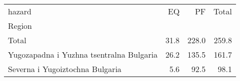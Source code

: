 \begin{tabular}{lrrr}
\toprule
hazard &    EQ &     PF &  Total \\
Region                                   &       &        &        \\
\midrule
Total                                    &  31.8 &  228.0 &  259.8 \\
Yugozapadna i Yuzhna tsentralna Bulgaria &  26.2 &  135.5 &  161.7 \\
Severna i Yugoiztochna Bulgaria          &   5.6 &   92.5 &   98.1 \\
\bottomrule
\end{tabular}
